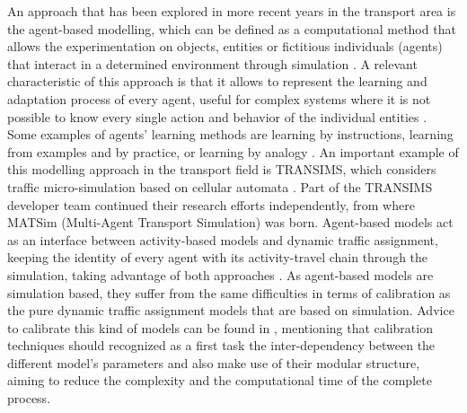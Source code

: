 \documentclass[Journal,letterpaper]{ascelike-new}
\begin{document}
An approach that has been explored in more recent years in the transport area is the agent-based modelling, which can be defined as a computational method that allows the experimentation on objects, entities or fictitious individuals (agents) that interact in a determined environment through simulation \citep{gilbert2008agent}. A relevant characteristic of this approach is that it allows to represent the learning and adaptation process of every agent, useful for complex systems where it is not possible to know every single action and behavior of the individual entities \citep{weiss1995adaptation}. Some examples of agents' learning methods are learning by instructions, learning from examples and by practice, or learning by analogy \citep{wei2010critical}. An important example of this modelling approach in the transport field is TRANSIMS, which considers traffic micro-simulation based on cellular automata \citep{smith1995transims,nagel1996parallel}. Part of the TRANSIMS developer team continued their research efforts independently, from where MATSim (Multi-Agent Transport Simulation) \citep{IntroMATSim} was born. Agent-based models act as an interface between activity-based models and dynamic traffic assignment, keeping the identity of every agent with its activity-travel chain through the simulation, taking advantage of both approaches \citep{rieser2007agent}. As agent-based models are simulation based, they suffer from the same difficulties in terms of calibration as the pure dynamic traffic assignment models that are based on simulation. Advice to calibrate this kind of models can be found in \cite{fehler2004techniques}, mentioning that calibration techniques should recognized as a first task the inter-dependency between the different model's parameters and also make use of their modular structure, aiming to reduce the complexity and the computational time of the complete process.
\end{document}
